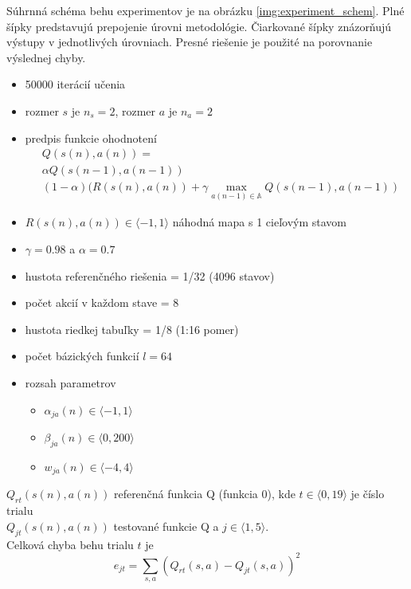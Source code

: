 Súhrnná schéma behu experimentov je na obrázku \ref{img:experiment_schem}.
Plné šípky predstavujú prepojenie úrovni metodológie. Čiarkované šípky znázorňujú
výstupy v jednotlivých úrovniach. Presné riešenie je použité na porovnanie výslednej chyby.



\begin{itemize}
\item 50000 iterácií učenia
\item rozmer $s$ je $n_s = 2$, rozmer $a$ je $n_a = 2$
\item predpis funkcie ohodnotení
\begin{align}
&Q(s(n),a(n)) = \nonumber \\
&\alpha Q(s(n-1),a(n-1)) \nonumber \\
&(1- \alpha)(R(s(n),a(n)) + \gamma \max_{a(n-1) \in \mathbb{A}} Q(s(n-1), a(n-1)) \nonumber
\end{align}

\item $R(s(n), a(n)) \in \langle -1, 1 \rangle$ náhodná mapa s 1 cieľovým stavom
\item $\gamma = 0.98$ a $\alpha = 0.7$
\item hustota referenčného riešenia = 1/32  (4096 stavov)
\item počet akcií v každom stave = 8
\item hustota riedkej tabuľky = 1/8  (1:16 pomer)
\item počet bázických funkcií $l = 64$
\item rozsah parametrov
    \begin{itemize}
      \item $\alpha_{ja}(n) \in \langle -1, 1 \rangle$
      \item $\beta_{ja}(n) \in \langle 0, 200 \rangle$
      \item $w_{ja}(n) \in \langle -4, 4 \rangle$
    \end{itemize}
\end{itemize}

$Q_{rt}(s(n),a(n))$ referenčná funkcia Q (funkcia 0), kde $t \in \langle 0, 19 \rangle $ je číslo trialu  \\
$Q_{jt}(s(n),a(n))$ testované funkcie Q a $j \in \langle 1, 5 \rangle $. \\

Celková chyba behu trialu $t$ je \\
\begin{equation}
e_{jt} = \sum\limits_{s, a}{(Q_{rt}(s,a) - Q_{jt}(s,a))^2}  \nonumber
\end{equation}

